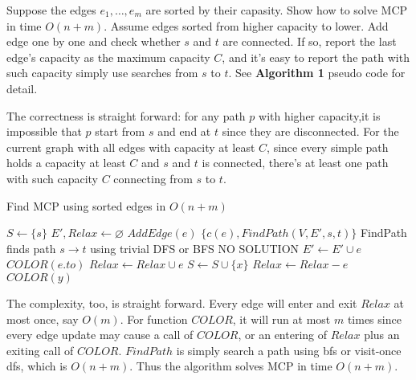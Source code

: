 \documentclass[11pt,a4paper,oneside]{article}
\begin{document}
\begin{problem}{1}
	\statement
	Suppose the edges $e_1,\dots,e_m$ are sorted by their capasity. Show how to solve MCP in time $O(n+m)$.
	\solution
	Assume edges sorted from higher capacity to lower. Add edge one by one and check whether \(s\) and \(t\) are connected. If so, report the last edge's capacity as the maximum capacity $C$, and it's easy to report the path with such capacity simply use searches from $s$ to $t$. See \textbf{Algorithm 1} pseudo code for detail.

	The correctness is straight forward: for any path $p$ with higher capacity,it is impossible that $p$ start from $s$ and end at $t$ since they are disconnected. For the current graph with all edges with capacity at least $C$, since every simple path holds a capacity at least $C$ and $s$ and $t$ is connected, there's at least one path with such capacity $C$ connecting from $s$ to $t$.

	\begin{algorithm}
		\caption{Find MCP using sorted edges in $O(n + m)$}
		\begin{algorithmic}[1]
			\State $S \leftarrow \{ s \}$
			\State $E',Relax \leftarrow \varnothing$
				\State $AddEdge(e)$
					\State \Return $\{c(e), FindPath(V, E', s, t)\}$
					\Comment FindPath finds path $s \rightarrow t$ using trivial DFS or BFS
				\EndIf
			\EndFor
			\State \Return NO SOLUTION
			\EndFunction
				\State $E' \leftarrow E' \cup e$
					\State $COLOR(e.to)$
				\Else
					\State $Relax \leftarrow Relax \cup e$
				\EndIf
			\EndFunction
				\State $S \leftarrow S \cup \{ x \}$
				\State $Relax \leftarrow Relax - e$
				\State $COLOR(y)$
				\EndFor
			\EndFunction
		\end{algorithmic}
	\end{algorithm}
	
	The complexity, too, is straight forward. Every edge will enter and exit $Relax$ at most once, say $O(m)$. For function $COLOR$, it will run at most $m$ times since every edge update may cause a call of $COLOR$, or an entering of $Relax$ plus an exiting call of $COLOR$. $FindPath$ is simply search a path using bfs or visit-once dfs, which is $O(n + m)$. Thus the algorithm solves MCP in time \(O(n + m)\).
\end{problem}
\end{document}
